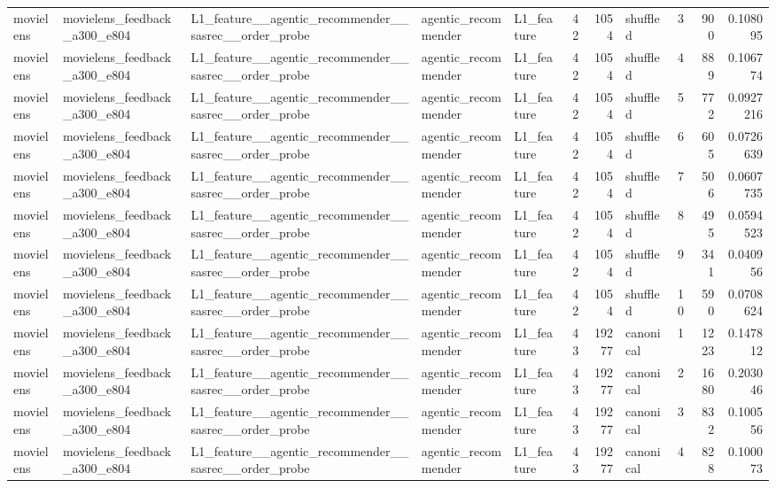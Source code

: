 \begin{table}[htbp!]
\begin{tabular}{lllllrrlrrr}
movielens & movielens\_feedback\_a300\_e804 & L1\_feature\_\_agentic\_recommender\_\_sasrec\_\_order\_probe & agentic\_recommender & L1\_feature & 42 & 1054 & shuffled & 3 & 900 & 0.108095 \\
movielens & movielens\_feedback\_a300\_e804 & L1\_feature\_\_agentic\_recommender\_\_sasrec\_\_order\_probe & agentic\_recommender & L1\_feature & 42 & 1054 & shuffled & 4 & 889 & 0.106774 \\
movielens & movielens\_feedback\_a300\_e804 & L1\_feature\_\_agentic\_recommender\_\_sasrec\_\_order\_probe & agentic\_recommender & L1\_feature & 42 & 1054 & shuffled & 5 & 772 & 0.0927216 \\
movielens & movielens\_feedback\_a300\_e804 & L1\_feature\_\_agentic\_recommender\_\_sasrec\_\_order\_probe & agentic\_recommender & L1\_feature & 42 & 1054 & shuffled & 6 & 605 & 0.0726639 \\
movielens & movielens\_feedback\_a300\_e804 & L1\_feature\_\_agentic\_recommender\_\_sasrec\_\_order\_probe & agentic\_recommender & L1\_feature & 42 & 1054 & shuffled & 7 & 506 & 0.0607735 \\
movielens & movielens\_feedback\_a300\_e804 & L1\_feature\_\_agentic\_recommender\_\_sasrec\_\_order\_probe & agentic\_recommender & L1\_feature & 42 & 1054 & shuffled & 8 & 495 & 0.0594523 \\
movielens & movielens\_feedback\_a300\_e804 & L1\_feature\_\_agentic\_recommender\_\_sasrec\_\_order\_probe & agentic\_recommender & L1\_feature & 42 & 1054 & shuffled & 9 & 341 & 0.040956 \\
movielens & movielens\_feedback\_a300\_e804 & L1\_feature\_\_agentic\_recommender\_\_sasrec\_\_order\_probe & agentic\_recommender & L1\_feature & 42 & 1054 & shuffled & 10 & 590 & 0.0708624 \\
movielens & movielens\_feedback\_a300\_e804 & L1\_feature\_\_agentic\_recommender\_\_sasrec\_\_order\_probe & agentic\_recommender & L1\_feature & 43 & 19277 & canonical & 1 & 1223 & 0.147812 \\
movielens & movielens\_feedback\_a300\_e804 & L1\_feature\_\_agentic\_recommender\_\_sasrec\_\_order\_probe & agentic\_recommender & L1\_feature & 43 & 19277 & canonical & 2 & 1680 & 0.203046 \\
movielens & movielens\_feedback\_a300\_e804 & L1\_feature\_\_agentic\_recommender\_\_sasrec\_\_order\_probe & agentic\_recommender & L1\_feature & 43 & 19277 & canonical & 3 & 832 & 0.100556 \\
movielens & movielens\_feedback\_a300\_e804 & L1\_feature\_\_agentic\_recommender\_\_sasrec\_\_order\_probe & agentic\_recommender & L1\_feature & 43 & 19277 & canonical & 4 & 828 & 0.100073 \\

\end{tabular}
\end{table}
